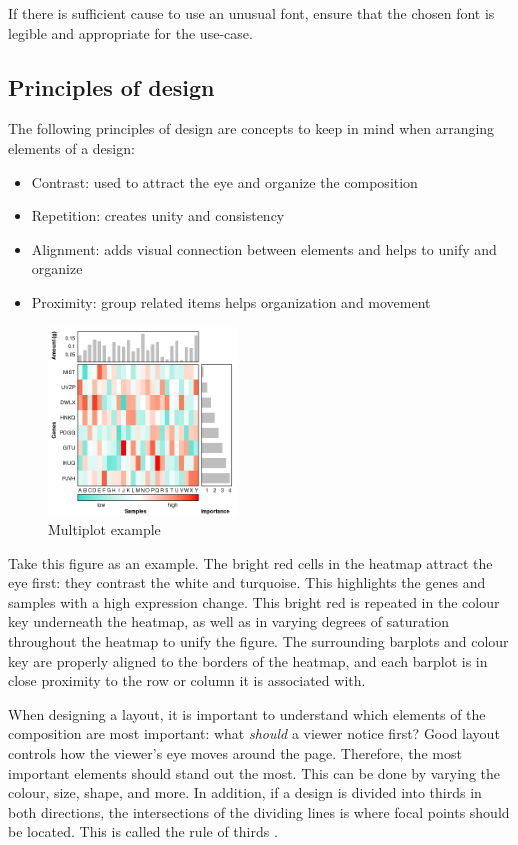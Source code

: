 \documentclass[letterpaper]{article}
\begin{document}
If there is sufficient cause to use an unusual font, ensure that the chosen font is legible and appropriate for the use-case. 

\subsection{Principles of design}
The following principles of design are concepts to keep in mind when arranging elements of a design: \cite{williams}
\begin{itemize}
\item Contrast: used to attract the eye and organize the composition
\item Repetition: creates unity and consistency
\item Alignment: adds visual connection between elements and helps to unify and organize
\item Proximity: group related items helps organization and movement
\end{itemize}

\begin{figure}[!ht]
  \begin{center}
     \includegraphics[width=50mm]{Figures/Multiplot_Ex2.png}
     \caption{Multiplot example}
  \end{center}
\end{figure}

Take this figure as an example. The bright red cells in the heatmap attract the eye first: they contrast the white and turquoise. This highlights the genes and samples with a high expression change. This bright red is repeated in the colour key underneath the heatmap, as well as in varying degrees of saturation throughout the heatmap to unify the figure. The surrounding barplots and colour key are properly aligned to the borders of the heatmap, and each barplot is in close proximity to the row or column it is associated with. 

When designing a layout, it is important to understand which elements of the composition are most important: what \textit{should} a viewer notice first? Good layout controls how the viewer's eye moves around the page. Therefore, the most important elements should stand out the most. This can be done by varying the colour, size, shape, and more. In addition, if a design is divided into thirds in both directions, the intersections of the dividing lines is where focal points should be located. This is called the rule of thirds \cite{wong3}.
\end{document}
